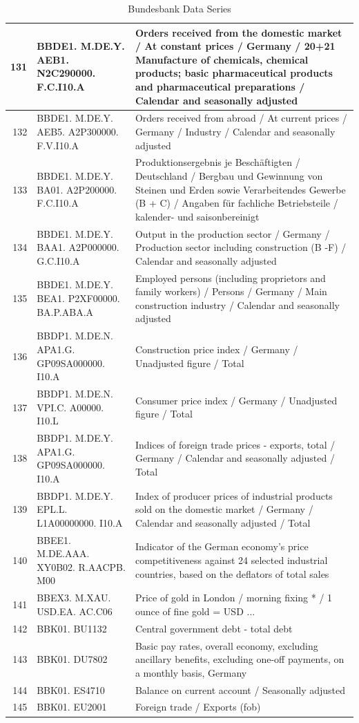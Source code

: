 \documentclass[12pt]{article}
\begin{document}
\begin{table}[ht]
\caption{Bundesbank Data Series}
\label{bb data 2}
\centering
\begin{tabular}{r|p{4cm}p{11cm}}
	\hline
	131 & BBDE1. M.DE.Y. AEB1. N2C290000. F.C.I10.A & Orders received from the domestic market / At constant prices / Germany / 20+21 Manufacture of chemicals, chemical products; basic pharmaceutical products and pharmaceutical preparations / Calendar and seasonally adjusted \\ 
	\hline
	132 & BBDE1. M.DE.Y. AEB5. A2P300000. F.V.I10.A & Orders received from abroad / At current prices / Germany / Industry / Calendar and seasonally adjusted \\ 
	\hline
	133 & BBDE1. M.DE.Y. BA01. A2P200000. F.C.I10.A & Produktionsergebnis je Beschäftigten / Deutschland / Bergbau und Gewinnung von Steinen und Erden sowie Verarbeitendes Gewerbe (B + C) / Angaben für fachliche Betriebsteile / kalender- und saisonbereinigt \\ 
	\hline
	134 & BBDE1. M.DE.Y. BAA1. A2P000000. G.C.I10.A & Output in the production sector / Germany / Production sector including construction (B -F) / Calendar and seasonally adjusted \\ 
	\hline
	135 & BBDE1. M.DE.Y. BEA1. P2XF00000. BA.P.ABA.A & Employed persons (including proprietors and family workers) / Persons / Germany / Main construction industry / Calendar and seasonally adjusted \\ 
	\hline
	136 & BBDP1. M.DE.N. APA1.G. GP09SA000000. I10.A & Construction price index / Germany / Unadjusted figure / Total \\ 
	\hline
	137 & BBDP1. M.DE.N. VPI.C. A00000. I10.L & Consumer price index / Germany / Unadjusted figure / Total \\ 
	\hline
	138 & BBDP1. M.DE.Y. APA1.G. GP09SA000000. I10.A & Indices of foreign trade prices - exports, total / Germany / Calendar and seasonally adjusted / Total \\ 
	\hline
	139 & BBDP1. M.DE.Y. EPL.L. L1A00000000. I10.A & Index of producer prices of industrial products sold on the domestic market / Germany / Calendar and seasonally adjusted / Total \\ 
	\hline
	140 & BBEE1. M.DE.AAA. XY0B02. R.AACPB. M00 & Indicator of the German economy's price competitiveness against 24 selected industrial countries, based on the deflators of total sales \\ 
	\hline
	141 & BBEX3. M.XAU. USD.EA. AC.C06 & Price of gold in London / morning fixing * / 1 ounce of fine gold = USD ... \\
	\hline 
	142 & BBK01. BU1132 & Central government debt - total debt \\ 
	\hline
	143 & BBK01. DU7802 & Basic pay rates, overall economy, excluding ancillary benefits, excluding one-off
	 payments, on a monthly basis, Germany \\ 
	 \hline
	144 & BBK01. ES4710 & Balance on current account / Seasonally adjusted \\ 
	\hline
	145 & BBK01. EU2001 & Foreign trade / Exports (fob) \\ 
	\hline
\end{tabular}
\end{table}
\end{document}
